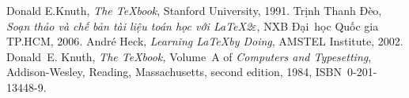 \begin{thebibliography}{9}
 Donald E.Knuth, {\em The \TeX book}, Stanford University, 1991.
 Trịnh Thanh Đèo, {\em Soạn thảo và chế bản tài liệu toán học với \LaTeX2$\varepsilon$}, NXB Đại~học Quốc gia TP.HCM, 2006.
 André Heck, {\em Learning \LaTeX  by Doing}, AMSTEL Institute, 2002.
 Donald~E. Knuth,  \newblock \textit{The \TeX{}book,}
Volume~A of \textit{Computers and Typesetting}, Addison-Wesley,
Reading, Massachusetts, second edition, 1984, ISBN~0-201-13448-9.
\end{thebibliography}

